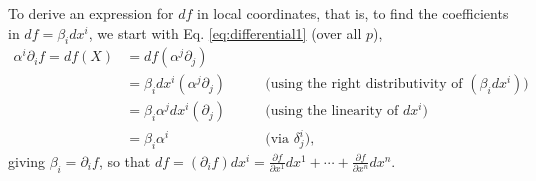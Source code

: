 \documentclass[psamsfonts]{amsart}
\theoremstyle{definition}
\theoremstyle{remark}
\numberwithin{equation}{section}
\begin{document}
To derive an expression for $df$ in local coordinates, that is, to find the coefficients in $df = \beta_i dx^i$, we start with Eq. \ref{eq:differential1} (over all $p$), 
\begin{equation}\begin{aligned}
\alpha^i\partial_{i}f = df(X) & = df\left(\alpha^j\partial_j\right) \\
& = \beta_i dx^i\left(\alpha^j\partial_j\right) &\qquad \text{(using the right distributivity of $\left(\beta_i dx^i\right)$)} \\
& = \beta_i \alpha^j dx^i(\partial_j) &\qquad \text{(using the linearity of $dx^i$)} \\
& = \beta_i \alpha^i &\qquad \text{(via $\delta^i_j$)}, 
\end{aligned}
\end{equation}
giving $\beta_i = \partial_{i}f$, so that $df = (\partial_{i}f) dx^i = \frac{\partial f}{\partial x^1}dx^1+\cdots + \frac{\partial f}{\partial x^n}dx^n $. 
\end{document}
